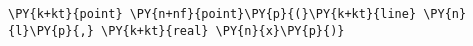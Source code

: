 \begin{Verbatim}[commandchars=\\\{\}]
    \PY{k+kt}{point} \PY{n+nf}{point}\PY{p}{(}\PY{k+kt}{line} \PY{n}{l}\PY{p}{,} \PY{k+kt}{real} \PY{n}{x}\PY{p}{)}
\end{Verbatim}
